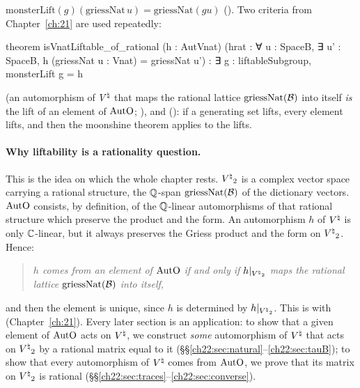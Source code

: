 $\mathrm{monsterLift}(g)(\mathrm{griessNat}\,u)=\mathrm{griessNat}(g u)$ ().  Two
criteria from Chapter~\ref{ch:21} are used repeatedly:
\begin{leancode}
theorem isVnatLiftable_of_rational (h : AutVnat)
    (hrat : ∀ u : SpaceB, ∃ u' : SpaceB, h (griessNat u : Vnat) = griessNat u') :
    ∃ g : liftableSubgroup, monsterLift g = h
\end{leancode}
(an automorphism of ${V^{\natural}}$ that maps the rational lattice $\mathrm{griessNat}(\mathcal{B})$ into itself \emph{is} the
lift of an element of $\mathrm{AutO}$; ), and
 (): if a
generating set lifts, every element lifts, and then the moonshine theorem applies to the lifts.

\paragraph{Why liftability is a rationality question.}  This is the idea on which the whole chapter rests.  ${V^{\natural}}_2$ is a
complex vector space carrying a rational structure, the ${\mathbb{Q}}$-span $\mathrm{griessNat}(\mathcal{B})$ of the dictionary
vectors.  $\mathrm{AutO}$ consists, by definition, of the ${\mathbb{Q}}$-linear automorphisms of that rational structure which
preserve the product and the form.  An automorphism $h$ of ${V^{\natural}}$ is only ${\mathbb{C}}$-linear, but it always preserves the
Griess product and the form on ${V^{\natural}}_2$.  Hence:
\begin{quote}
\emph{$h$ comes from an element of $\mathrm{AutO}$ if and only if $h|_{{V^{\natural}}_2}$ maps the rational lattice
$\mathrm{griessNat}(\mathcal{B})$ into itself,}
\end{quote}
and then the element is unique, since $h$ is determined by $h|_{{V^{\natural}}_2}$.  This is  with
 (Chapter~\ref{ch:21}).  Every later section is an application: to show that a given
element of $\mathrm{AutO}$ acts on ${V^{\natural}}$, we construct \emph{some} automorphism of ${V^{\natural}}$ that acts on ${V^{\natural}}_2$ by a
rational matrix equal to it (\S\S\ref{ch22:sec:natural}--\ref{ch22:sec:tauB}); to show that every automorphism of ${V^{\natural}}$ comes
from $\mathrm{AutO}$, we prove that its matrix on ${V^{\natural}}_2$ is rational
(\S\S\ref{ch22:sec:traces}--\ref{ch22:sec:converse}).

